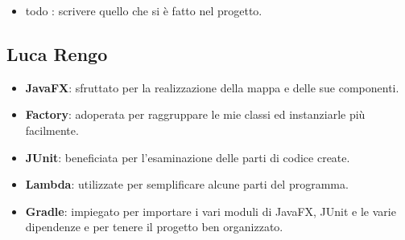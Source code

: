 \begin{itemize}
	\item  todo : scrivere quello che si è fatto nel progetto.
\end{itemize}

\subsection*{Luca Rengo}

\begin{itemize}
	\item \textsf{\small \textbf{JavaFX}: sfruttato per la realizzazione della mappa e delle sue componenti.}
	\item \textsf{\small \textbf{Factory}: adoperata per raggruppare le mie classi ed instanziarle più facilmente.}
	\item \textsf{\small \textbf{JUnit}: beneficiata per l'esaminazione delle parti di codice create.}
	\item \textsf{\small \textbf{Lambda}: utilizzate per semplificare alcune parti del programma.}
	\item \textsf{\small \textbf{Gradle}: impiegato per importare i vari moduli di JavaFX, JUnit e le varie dipendenze e per tenere il progetto ben organizzato.}
\end{itemize}